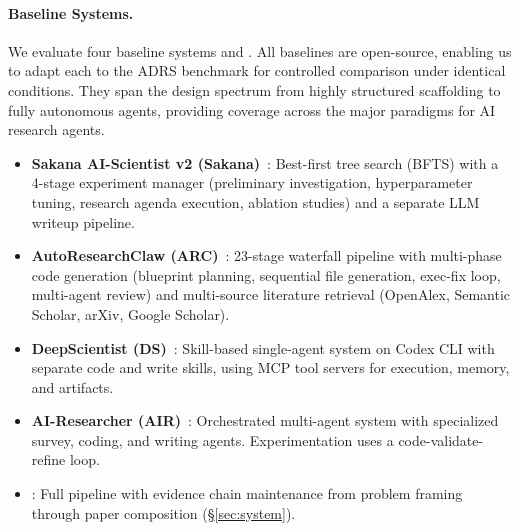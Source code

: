 \paragraph{Baseline Systems.}
We evaluate four baseline systems and \sys{}.
All baselines are open-source, enabling us to adapt each to the ADRS benchmark for controlled comparison under identical conditions.
They span the design spectrum from highly structured scaffolding to fully autonomous agents, providing coverage across the major paradigms for AI research agents.
\begin{itemize}[nosep,leftmargin=*]
  \item \textbf{Sakana AI-Scientist v2 (Sakana)}~\citep{yamada2025aiscientistv2}: Best-first tree search (BFTS) with a 4-stage experiment manager (preliminary investigation, hyperparameter tuning, research agenda execution, ablation studies) and a separate LLM writeup pipeline.
  \item \textbf{AutoResearchClaw (ARC)}~\citep{li2024autoresearchclaw}: 23-stage waterfall pipeline with multi-phase code generation (blueprint planning, sequential file generation, exec-fix loop, multi-agent review) and multi-source literature retrieval (OpenAlex, Semantic Scholar, arXiv, Google Scholar).
  \item \textbf{DeepScientist (DS)}~\citep{huang2025deepscientist}: Skill-based single-agent system on Codex CLI with separate code and write skills, using MCP tool servers for execution, memory, and artifacts.
  \item \textbf{AI-Researcher (AIR)}~\citep{tang2025airesearcher}: Orchestrated multi-agent system with specialized survey, coding, and writing agents. Experimentation uses a code-validate-refine loop.
  \item \textbf{\sys{}}: Full pipeline with evidence chain maintenance from problem framing through paper composition (\S\ref{sec:system}).
\end{itemize}

